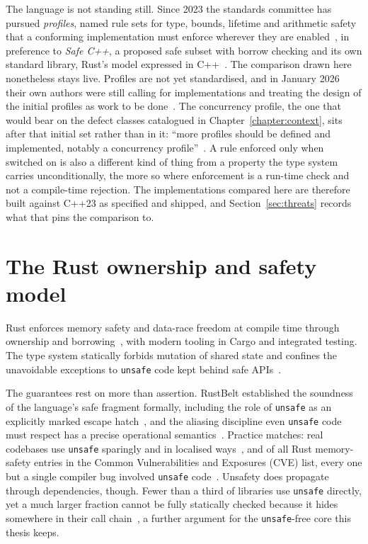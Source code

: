 The language is not standing still. Since 2023 the standards committee has pursued
\emph{profiles}, named rule sets for type, bounds, lifetime and arithmetic safety that a
conforming implementation must enforce wherever they are enabled~\cite{sutter2025profiles}, in
preference to \emph{Safe C++}, a proposed safe subset with borrow checking and its own standard
library, Rust's model expressed in C++~\cite{baxter2024safecpp}. The comparison drawn here
nonetheless stays live. Profiles are not yet standardised, and in January 2026 their own authors
were still calling for implementations and treating the design of the initial profiles as work to
be done~\cite{vandevoorde2026profiles}. The concurrency profile, the one that would bear on the
defect classes catalogued in Chapter~\ref{chapter:context}, sits after that initial set rather
than in it: ``more profiles should be defined and implemented, notably a concurrency
profile''~\cite{vandevoorde2026profiles}. A rule enforced only when switched on is also a
different kind of thing from a property the type system carries unconditionally, the more so
where enforcement is a run-time check and not a compile-time rejection. The implementations
compared here are therefore built against C++23 as specified and shipped, and
Section~\ref{sec:threats} records what that pins the comparison to.

\section{The Rust ownership and safety model}
Rust enforces memory safety and data-race freedom at compile time through ownership and
borrowing~\cite{klabnik2023rust}, with modern tooling in Cargo and integrated testing. The type
system statically forbids mutation of shared state and confines the unavoidable exceptions to
\texttt{unsafe} code kept behind safe APIs~\cite{jung2021safe}.

The guarantees rest on more than assertion. RustBelt established the soundness of the language's
safe fragment formally, including the role of \texttt{unsafe} as an explicitly marked escape
hatch~\cite{jung2018rustbelt}, and the aliasing discipline even \texttt{unsafe} code must respect
has a precise operational semantics~\cite{jung2020stacked}. Practice matches: real codebases use
\texttt{unsafe} sparingly and in localised ways~\cite{qin2020rust,astrauskas2020unsafe}, and of
all Rust memory-safety entries in the Common Vulnerabilities and Exposures (CVE) list, every one
but a single compiler bug involved \texttt{unsafe} code~\cite{xu2021rustcve}. Unsafety does
propagate through dependencies, though. Fewer than a third of libraries use \texttt{unsafe}
directly, yet a much larger fraction cannot be fully statically checked because it hides
somewhere in their call chain~\cite{evans2020rust}, a further argument for the
\texttt{unsafe}-free core this thesis keeps.

